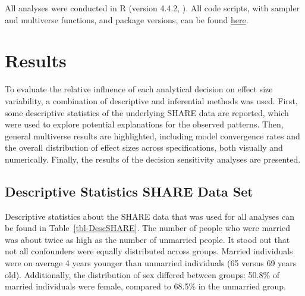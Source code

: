 \documentclass[
  man,
  floatsintext,
  longtable,
  nolmodern,
  notxfonts,
  notimes,
  colorlinks=true,linkcolor=blue,citecolor=blue,urlcolor=blue]{apa7}
\begin{document}
All analyses were conducted in R (version 4.4.2,
). All code scripts, with
sampler and multiverse functions, and package versions, can be found
\href{https://github.com/lodewijn/ManyAnalystThesisCompendium}{here}.

\section{Results}\label{results}

To evaluate the relative influence of each analytical decision on effect
size variability, a combination of descriptive and inferential methods
was used. First, some descriptive statistics of the underlying SHARE
data are reported, which were used to explore potential explanations for
the observed patterns. Then, general multiverse results are highlighted,
including model convergence rates and the overall distribution of effect
sizes across specifications, both visually and numerically. Finally, the
results of the decision sensitivity analyses are presented.

\subsection{Descriptive Statistics SHARE Data
Set}\label{descriptive-statistics-share-data-set}

Descriptive statistics about the SHARE data that was used for all
analyses can be found in Table~\ref{tbl-DescSHARE}. The number of people
who were married was about twice as high as the number of unmarried
people. It stood out that not all confounders were equally distributed
across groups. Married individuals were on average 4 years younger than
unmarried individuals (65 versus 69 years old). Additionally, the
distribution of sex differed between groups: 50.8\% of married
individuals were female, compared to 68.5\% in the unmarried group.
\end{document}
